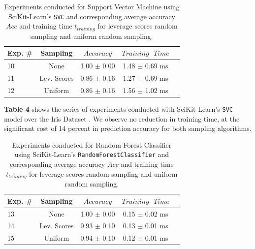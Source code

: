 \documentclass{article}
\theoremstyle{plain}
\theoremstyle{definition}
\theoremstyle{remark}
\begin{document}
\begin{table}[t]
	\caption{Experiments conducted for Support Vector Machine using SciKit-Learn's \texttt{SVC} and corresponding average accuracy $Acc$ and training time $t_{training}$ for leverage scores random sampling and uniform random sampling.}
	\label{t4}
	\vskip 0.15in
	\begin{center}
		\begin{small}
			\begin{sc}
				\begin{tabular}{lcccr}
					\toprule
					Exp. \# & Sampling & $Accuracy$ & $Training \text{ } Time$\\
					\midrule
					10 & None & 1.00 $\pm$ 0.00 & 1.48 $\pm$ 0.69 ms \\
					11 & Lev. Scores & 0.86 $\pm$ 0.16 & 1.27 $\pm$ 0.69 ms \\
					12 & Uniform & 0.86 $\pm$ 0.16 & 1.56 $\pm$ 1.02 ms \\
					\bottomrule
				\end{tabular}
			\end{sc}
		\end{small}
	\end{center}
	\vskip -0.1in
\end{table}

\textbf{Table 4} shows the series of experiments conducted with SciKit-Learn's \texttt{SVC} model over the Iris Dataset \cite{iris}. We observe no reduction in training time, at the significant cost of 14 percent in prediction accuracy for both sampling algorithms.

\begin{table}[t]
	\caption{Experiments conducted for Random Forest Classifier using SciKit-Learn's \texttt{RandomForestClassifier} and corresponding average accuracy $Acc$ and training time $t_{training}$ for leverage scores random sampling and uniform random sampling.}
	\label{t5}
	\vskip 0.15in
	\begin{center}
		\begin{small}
			\begin{sc}
				\begin{tabular}{lcccr}
					\toprule
					Exp. \# & Sampling & $Accuracy$ & $Training \text{ } Time$\\
					\midrule
					13 & None & 1.00 $\pm$ 0.00 & 0.15 $\pm$ 0.02 ms \\
					14 & Lev. Scores & 0.93 $\pm$ 0.10 & 0.13 $\pm$ 0.01 ms \\
					15 & Uniform & 0.94 $\pm$ 0.10 & 0.12 $\pm$ 0.01 ms \\
					\bottomrule
				\end{tabular}
			\end{sc}
		\end{small}
	\end{center}
	\vskip -0.1in
\end{table}
\end{document}
